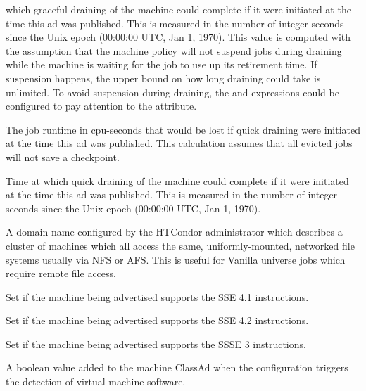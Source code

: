 \begin{description}
which graceful draining of the machine could complete if it were
initiated at the time this ad was published.  This is measured in the
number of integer seconds since the Unix epoch (00:00:00 UTC, Jan 1,
1970).  This value is computed with the assumption that the machine
policy will not suspend jobs during draining while the machine is
waiting for the job to use up its retirement time.  If suspension
happens, the upper bound on how long draining could take is
unlimited.  To avoid suspension during draining, the 
and  expressions could be configured to pay
attention to the  attribute.
%
\item[\AdAttr{ExpectedMachineGracefulQuickBadput}:] The
job runtime in cpu-seconds that would be lost if quick draining
were initiated at the time this ad was published.  This calculation assumes
that all evicted jobs will not save a checkpoint.
%
\item[\AdAttr{ExpectedMachineQuickDrainingCompletion}:] Time at
which quick draining of the machine could complete if it were
initiated at the time this ad was published.  This is measured in the
number of integer seconds since the Unix epoch (00:00:00 UTC, Jan 1,
1970).
%
\item[\AdAttr{FileSystemDomain}:] A domain name configured by the
HTCondor administrator which describes a cluster of machines which all
access the same, uniformly-mounted, networked file systems usually via
NFS or AFS.  This is useful for Vanilla universe jobs which require
remote file access.
%
\item[\AdAttr{has\_sse4\_1}:] Set if the machine being advertised supports
the SSE 4.1 instructions.
%
\item[\AdAttr{has\_sse4\_2}:] Set if the machine being advertised supports
the SSE 4.2 instructions.
%
\item[\AdAttr{has\_ssse3}:] Set if the machine being advertised supports
the SSSE 3 instructions.
%
\item[\AdAttr{HasVM}:] A boolean value added to the machine ClassAd
when the configuration triggers the detection of virtual machine
software.
%

\end{description}
